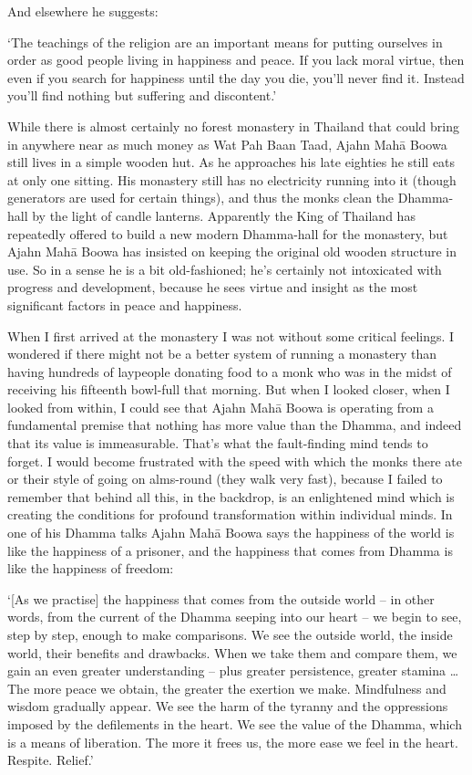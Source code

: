 And elsewhere he suggests:

`The teachings of the religion are an important means for putting
ourselves in order as good people living in happiness and peace. If you
lack moral virtue, then even if you search for happiness until the day
you die, you'll never find it. Instead you'll find nothing but suffering
and discontent.'

While there is almost certainly no forest monastery in Thailand that
could bring in anywhere near as much money as Wat Pah Baan Taad, Ajahn
Mahā Boowa still lives in a simple wooden hut. As he approaches his late
eighties he still eats at only one sitting. His monastery still has no
electricity running into it (though generators are used for certain
things), and thus the monks clean the Dhamma-hall by the light of candle
lanterns. Apparently the King of Thailand has repeatedly offered to
build a new modern Dhamma-hall for the monastery, but Ajahn Mahā Boowa
has insisted on keeping the original old wooden structure in use. So in
a sense he is a bit old-fashioned; he's certainly not intoxicated with
progress and development, because he sees virtue and insight as the most
significant factors in peace and happiness. 

When I first arrived at the monastery I was not without some critical
feelings. I wondered if there might not be a better system of running a
monastery than having hundreds of laypeople donating food to a monk who
was in the midst of receiving his fifteenth bowl-full that morning. But
when I looked closer, when I looked from within, I could see that Ajahn
Mahā Boowa is operating from a fundamental premise that nothing has more
value than the Dhamma, and indeed that its value is immeasurable. That's
what the fault-finding mind tends to forget. I would become frustrated
with the speed with which the monks there ate or their style of going on
alms-round (they walk very fast), because I failed to remember that
behind all this, in the backdrop, is an enlightened mind which is
creating the conditions for profound transformation within individual
minds. In one of his Dhamma talks Ajahn Mahā Boowa says the happiness of
the world is like the happiness of a prisoner, and the happiness that
comes from Dhamma is like the happiness of freedom: 

`[As we practise] the happiness that comes from the outside world
-- in other words, from the current of the Dhamma seeping into our
heart -- we begin to see, step by step, enough to make comparisons. We
see the outside world, the inside world, their benefits and drawbacks. 
When we take them and compare them, we gain an even greater
understanding -- plus greater persistence, greater stamina \ldots{} The
more peace we obtain, the greater the exertion we make. Mindfulness and
wisdom gradually appear. We see the harm of the tyranny and the
oppressions imposed by the defilements in the heart. We see the value of
the Dhamma, which is a means of liberation. The more it frees us, the
more ease we feel in the heart. Respite. Relief.'

